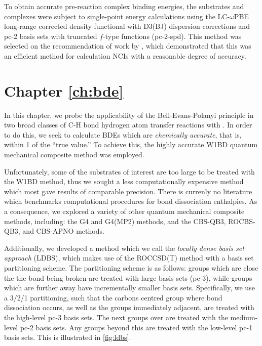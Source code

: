 To obtain accurate pre-reaction complex binding energies, the substrates and
complexes were subject to single-point energy calculations using the
LC-$\omega$PBE long-range corrected density
functional\cite{Vydrov2006,Vydrov2006a} with D3(BJ) dispersion corrections and
pc-2 basis sets with truncated $f$-type functions (pc-2-spd).\cite{Johnson2013}
This method was selected on the recommendation of work by \citet{Johnson2013},
which demonstrated that this was an efficient method for calculation NCIs with a
reasonable degree of accuracy.

\section{Chapter \ref{ch:bde}}

In this chapter, we probe the applicability of the Bell-Evans-Polanyi principle
in two broad classes of C-H bond hydrogen atom transfer reactions with \cumo. In
order to do this, we seek to calculate BDEs which are \emph{chemically
  accurate}, that is, within 1 \kcalmol of the ``true value.'' To achieve this,
the highly accurate W1BD\cite{Barnes2009} quantum mechanical composite method
was employed.

Unfortunately, some of the substrates of interest are too large to be treated
with the W1BD method, thus we sought a less computationally expensive method
which most gave results of comparable precision. There is currenly no literature
which benchmarks computational procedures for bond dissociation enthalpies. As a
consequence, we explored a variety of other quantum mechanical composite
methods, including: the G4 and G4(MP2) methods,\cite{Curtiss2007,Curtiss2007a}
and the CBS-QB3, ROCBS-QB3, and CBS-APNO
methods.\cite{Montgomery1999,Montgomery2000,Ochterski1996}

  Additionally, we developed a method which we call the \emph{locally
  dense basis set approach} (LDBS), which makes use of the ROCCSD(T) method with
a basis set partitioning scheme. The partitioning scheme is as follows: groups
which are close the the bond being broken are treated with large basis sets
(pc-3), while groups which are further away have incrementally smaller basis
sets. Specifically, we use a 3/2/1 partitioning, such that the carbons centred
group where bond dissociation occurs, as well as the groups immediately
adjacent, are treated with the high-level pc-3 basis sets. The next groups over
are treated with the medium-level pc-2 basis sets. Any groups beyond this are
treated with the low-level pc-1 basis sets. This is illustrated in
\ref{fig:ldbs}.


